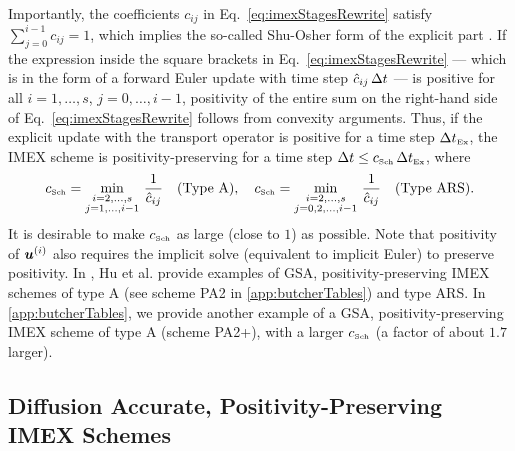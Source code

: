 Importantly, the coefficients $c_{ij}$ in Eq.~\eqref{eq:imexStagesRewrite} satisfy $\sum_{j=0}^{i-1}c_{ij}=1$, which implies the so-called Shu-Osher form of the explicit part \cite{shuOsher_1988}.  
If the expression inside the square brackets in Eq.~\eqref{eq:imexStagesRewrite} --- which is in the form of a forward Euler update with time step $\hat{c}_{ij}\,\Delta t$ --- is positive for all $i=1,\ldots,s$, $j=0,\ldots,i-1$, positivity of the entire sum on the right-hand side of Eq.~\eqref{eq:imexStagesRewrite} follows from convexity arguments.  
Thus, if the explicit update with the transport operator is positive for a time step $\Delta t_{\mbox{\tiny Ex}}$, the IMEX scheme is positivity-preserving for a time step $\Delta t\le c_{\mbox{\tiny Sch}}\,\Delta t_{\mbox{\tiny Ex}}$, where
\begin{equation}
  c_{\mbox{\tiny Sch}}=\min_{\substack{i = 2,\ldots,s \\ 
       j = 1,\ldots,i-1}}\,\frac{1}{\hat{c}_{ij}} \quad \text{(Type A)}, \quad  c_{\mbox{\tiny Sch}}=\min_{\substack{i = 2,\ldots,s \\ 
              j = 0,2,\ldots,i-1}}\,\frac{1}{\hat{c}_{ij}} \quad \text{(Type ARS)}.
  \label{eq:imexCFL}
\end{equation}
It is desirable to make $c_{\mbox{\tiny Sch}}$ as large (close to $1$) as possible.  
Note that positivity of $\boldsymbol{u}^{(i)}$ also requires the implicit solve (equivalent to implicit Euler) to preserve positivity.  
In \cite{hu_etal_2018}, Hu et al. provide examples of GSA, positivity-preserving IMEX schemes of type A (see scheme PA2 in \ref{app:butcherTables}) and type ARS.  
In \ref{app:butcherTables}, we provide another example of a GSA, positivity-preserving IMEX scheme of type A (scheme PA2+), with a larger $c_{\mbox{\tiny Sch}}$ (a factor of about $1.7$ larger).  

\subsection{Diffusion Accurate, Positivity-Preserving IMEX Schemes}

